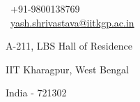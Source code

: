 \begin{multicols}{3}
\scriptsize  \faPhone\ +91-9800138769\\
\scriptsize \faEnvelope\ {\href{mailto:yash.shrivastava@iitkgp.ac.in}{yash.shrivastava@iitkgp.ac.in}}
\columnbreak
\footnotesize\par{\par} %
\par{\hfill\par}
\columnbreak
\raggedright\hfill\scriptsize{A-211, LBS Hall of Residence}\\ 
\raggedright\hfill\scriptsize{IIT Kharagpur, West Bengal}\\
\raggedright\hfill\scriptsize{India - 721302}\\
\end{multicols}
\vspace{-0.4cm}
